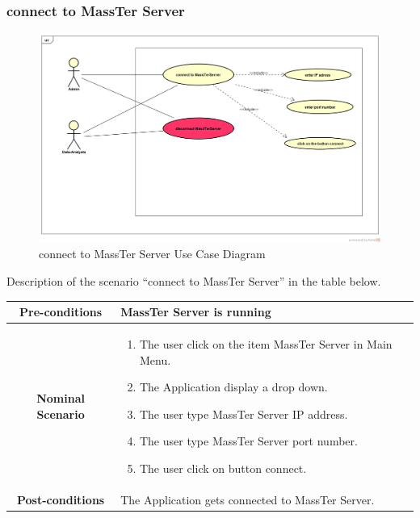 	 \subsubsection{connect to MassTer Server}
	 	\begin{figure}[h]
	 	\centering
	 	\includegraphics[width=1.0\textwidth]{connectToMassTerServer.png}
	 	\caption{connect to MassTer Server Use Case Diagram}
	 	
	 \end{figure}

  \newpage
 
 Description of the scenario ``connect to MassTer Server'' in the table below. 
 \\
 
 \begin{table}
 	\centering
 	\begin{tabular}{|c|p{10cm}|}
 		\hline 	
 		\textbf{Pre-conditions } & MassTer Server is running  \\ 
 		\hline                     
 		\textbf{Nominal Scenario } & \begin{enumerate}
 			\item The user click on the item MassTer Server in Main Menu.
 			\item The Application display a drop down. 
 			\item The user type MassTer Server IP address.
 			\item The user type MassTer Server port number.
 			\item The  user click on button connect. 
 		\end{enumerate} \\ 
 		\hline 
 		\textbf{Post-conditions} & The Application gets connected to MassTer Server. \\
 		\hline 
 	\end{tabular}
 \end{table}


